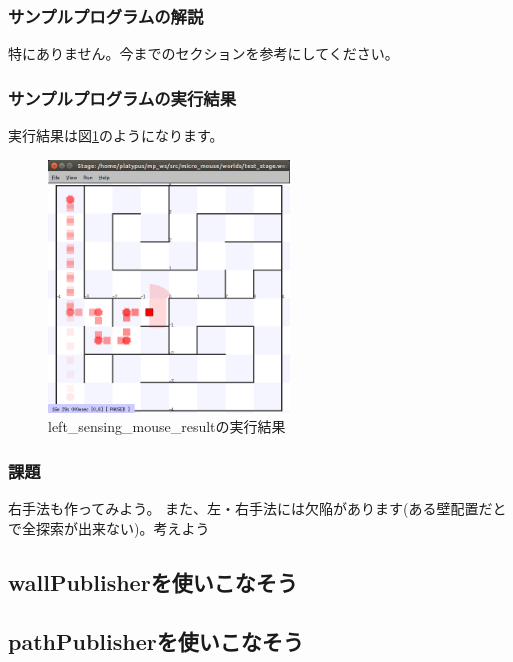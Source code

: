 \documentclass[11pt,a4paper]{jsarticle}
\begin{document}
\subsubsection{サンプルプログラムの解説}
特にありません。今までのセクションを参考にしてください。


\subsubsection{サンプルプログラムの実行結果}
実行結果は図\ref{left_sensing_mouse_result}のようになります。
\begin{figure}[h]
  \begin{center}
    \includegraphics[width=64mm]{./left_sensing_mouse_result.png}
  \end{center}
  \label{left_sensing_mouse_result}
  \caption{left\_sensing\_mouse\_resultの実行結果}
\end{figure}

\subsubsection{課題}
右手法も作ってみよう。
また、左・右手法には欠陥があります(ある壁配置だとで全探索が出来ない)。考えよう


\newpage
\subsection{wallPublisherを使いこなそう}





\newpage
\subsection{pathPublisherを使いこなそう}
\end{document}
